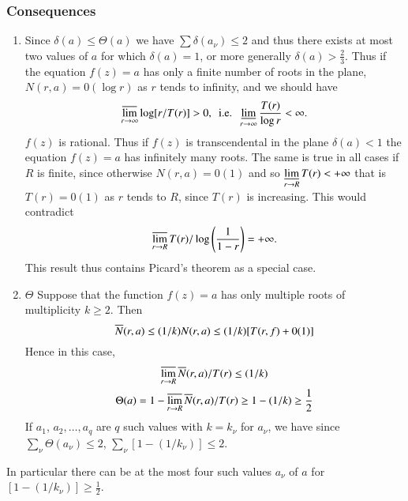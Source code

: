 \subsubsection{Consequences}\label{part2-subsubsec2.4.1}

\begin{enumerate}
\renewcommand{\labelenumi}{(\theenumi)}
\item Since $\delta(a)\leq \Theta(a)$ we have $\sum
  \delta(a_{\nu})\leq 2$ and thus there exists at most two values of $a$
  for which $\delta(a)=1$, or more generally
  $\delta(a)>\frac{2}{3}$. Thus if the equation $f(z)=a$ has only a
  finite number of roots in the plane, $N(r,a)=0(\log r)$ as $r$ tends
  to infinity, and we should have
$$
\mathop{\overline{\lim}}\limits_{r\to \infty}\log[r/T(r)]>0,\text{ \ {i.e.}\kern.3em\ }
\mathop{\underline{\lim}}\limits_{r\to \infty}\frac{T(r)}{\log r}<\infty.
$$
\iec $f(z)$ is rational. Thus if $f(z)$ is transcendental in the plane
$\delta(a) <1$ the equation $f(z)=a$ has infinitely many roots. The
same is true in all cases if $R$ is finite, since otherwise
$N(r,a)=0(1)$ and so $\mathop{\underline{\lim}}\limits_{r\to R}T(r)<+\infty$
that is $T(r)=0(1)$ as $r$ tends to $R$, since $T(r)$ is
increasing. This would contradict 
$$\mathop{\overline{\lim}}\limits_{r\to
  R}T(r)/\log\left(\dfrac{1}{1-r}\right)=+\infty.$$ 
This result thus contains Picard's theorem as a special case. 

\item $\Theta$
  Suppose that the 
  function $f(z)=a$ has only multiple roots of multiplicity $k\geq
  2$. Then 
$$
\overline{N}(r,a)\leq (1/k)N(r,a)\leq (1/k)[T(r,f)+0(1)]
$$
Hence in this case,
\begin{gather*}
\mathop{\overline{\lim}}\limits_{r\to R}\overline{N}(r,a)/T(r)\leq (1/k)\\
\Theta(a)=1-\mathop{\overline{\lim}}\limits_{r\to R}\overline{N}(r,a)/T(r)\geq
1-(1/k)\geq \frac{1}{2}
\end{gather*}
If $a_{1}$, $a_{2},\ldots,a_{q}$ are $q$ such values with $k=k_{\nu}$
for $a_{\nu}$, we have since $\sum\limits_{\nu}\Theta(a_{\nu})\leq 2$,
$\sum\limits_{\nu}[1-(1/k_{\nu})]\leq 2$.
\end{enumerate}

In particular there can be at the most four such values $a_{\nu}$ of $a$
for $[1-(1/k_{\nu})]\geq \frac{1}{2}$.

